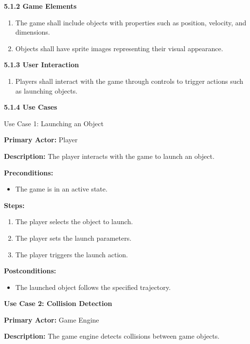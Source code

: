 \documentclass[
]{article}
\begin{document}
\textbf{5.1.2 Game Elements}

\begin{enumerate}
\def\labelenumi{\arabic{enumi}.}
\item
  The game shall include objects with properties such as position,
  velocity, and dimensions.
\item
  Objects shall have sprite images representing their visual appearance.
\end{enumerate}

\textbf{5.1.3 User Interaction}

\begin{enumerate}
\def\labelenumi{\arabic{enumi}.}
\item
  Players shall interact with the game through controls to trigger
  actions such as launching objects.
\end{enumerate}

\textbf{5.1.4 Use Cases}

Use Case 1: Launching an Object

\textbf{Primary Actor:} Player

\textbf{Description:} The player interacts with the game to launch an
object.

\textbf{Preconditions:}

\begin{itemize}
\item
  The game is in an active state.
\end{itemize}

\textbf{Steps:}

\begin{enumerate}
\def\labelenumi{\arabic{enumi}.}
\item
  The player selects the object to launch.
\item
  The player sets the launch parameters.
\item
  The player triggers the launch action.
\end{enumerate}

\textbf{Postconditions:}

\begin{itemize}
\item
  The launched object follows the specified trajectory.
\end{itemize}

\textbf{Use Case 2: Collision Detection}

\textbf{Primary Actor:} Game Engine

\textbf{Description:} The game engine detects collisions between game
objects.
\end{document}
